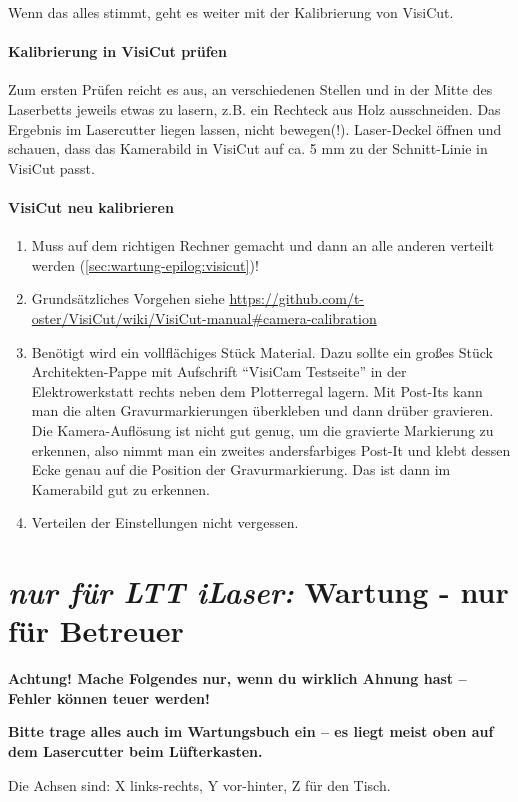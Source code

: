 \documentclass{\basedir/fablab-document}
\newcommand{\nurLTT}{\emph{nur für LTT iLaser:} }
\begin{document}
	Wenn das alles stimmt, geht es weiter mit der Kalibrierung von VisiCut.

	\paragraph{Kalibrierung in VisiCut prüfen}
	Zum ersten Prüfen reicht es aus, an verschiedenen Stellen und in der Mitte des Laserbetts jeweils etwas zu lasern, z.B. ein Rechteck aus Holz ausschneiden. Das Ergebnis im Lasercutter liegen lassen, nicht bewegen(!). Laser-Deckel öffnen und schauen, dass das Kamerabild in VisiCut auf ca. 5 mm zu der Schnitt-Linie in VisiCut passt.

	\paragraph{VisiCut neu kalibrieren}
	\begin{enumerate}
		\item Muss auf dem richtigen Rechner gemacht und dann an alle anderen verteilt werden (\cref{sec:wartung-epilog:visicut})!
		\item Grundsätzliches Vorgehen siehe \url{https://github.com/t-oster/VisiCut/wiki/VisiCut-manual#camera-calibration}
		\item Benötigt wird ein vollflächiges Stück Material. Dazu sollte ein großes Stück Architekten-Pappe mit Aufschrift \enquote{VisiCam Testseite} in der Elektrowerkstatt rechts neben dem Plotterregal lagern. Mit Post-Its kann man die alten Gravurmarkierungen überkleben und dann drüber gravieren. Die Kamera-Auflösung ist nicht gut genug, um die gravierte Markierung zu erkennen, also nimmt man ein zweites andersfarbiges Post-It und klebt dessen Ecke genau auf die Position der Gravurmarkierung. Das ist dann im Kamerabild gut zu erkennen.
		\item Verteilen der Einstellungen nicht vergessen.
	\end{enumerate}


	\section{\nurLTT Wartung - nur für Betreuer}
	\label{sec:wartung-ltt}
	\textbf{Achtung! Mache Folgendes nur, wenn du wirklich Ahnung hast -- Fehler können teuer werden!}
	
	\textbf{Bitte trage alles auch im Wartungsbuch ein -- es liegt meist oben auf dem Lasercutter beim Lüfterkasten.}

	Die Achsen sind: X links-rechts, Y vor-hinter, Z für den Tisch.
\end{document}
